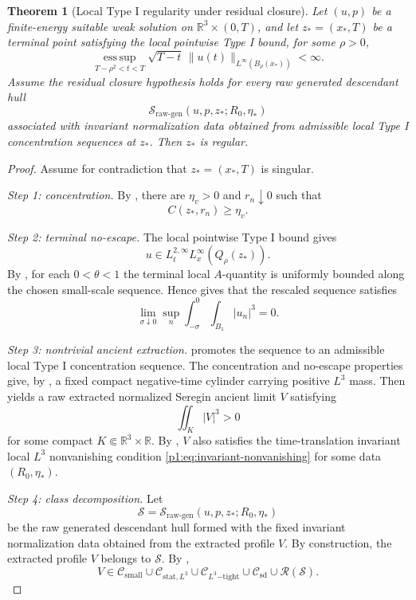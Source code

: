 \documentclass[11pt]{amsart}
\theoremstyle{plain}
\newtheorem{theorem}{Theorem}[section]
\theoremstyle{definition}
\theoremstyle{remark}
\numberwithin{equation}{section}
\newcommand{\R}{\mathbb R}
\newcommand{\esssup}{\operatorname*{ess\,sup}}
\newcommand{\calS}{\mathcal S}
\newcommand{\calR}{\mathcal R}
\newcommand{\calC}{\mathcal C}
\begin{document}
\begin{theorem}[Local Type I regularity under residual closure]
\label{p1:thm:final-assembly}
Let \((u,p)\) be a finite-energy suitable weak solution on
\(\R^3\times(0,T)\), and let \(z_*=(x_*,T)\) be a terminal point satisfying
the local pointwise Type I bound, for some \(\rho>0\),
\[
  \esssup_{T-\rho^2<t<T}
  \sqrt{T-t}\,\|u(t)\|_{L^\infty(B_\rho(x_*))}<\infty .
\]
Assume the residual closure hypothesis  holds for
every raw generated descendant hull
\[
   \calS_{\mathrm{raw\text{-}gen}}(u,p,z_*;R_0,\eta_*)
\]
associated with invariant normalization data obtained from admissible local
Type I concentration sequences at \(z_*\).
Then \(z_*\) is regular.
\end{theorem}

\begin{proof}
Assume for contradiction that \(z_*=(x_*,T)\) is singular.

\emph{Step 1: concentration.}
By , there are \(\eta_v>0\) and
\(r_n\downarrow0\) such that
\[
   C(z_*,r_n)\ge\eta_v .
\]

\emph{Step 2: terminal no-escape.}
The local pointwise Type I bound gives
\[
   u\in L_t^{2,\infty}L_x^\infty(Q_\rho(z_*)).
\]
By , for each \(0<\theta<1\) the
terminal local \(A\)-quantity is uniformly bounded along the chosen
small-scale sequence.  Hence  gives that
the rescaled sequence satisfies
\[
   \lim_{\sigma\downarrow0}\sup_n
   \int_{-\sigma}^{0}\int_{B_1}|u_n|^3=0 .
\]

\emph{Step 3: nontrivial ancient extraction.}
 promotes the sequence to
an admissible local Type I concentration sequence.  The concentration and no-escape
properties give, by
, a fixed compact
negative-time cylinder carrying positive \(L^3\) mass.  Then
 yields a raw extracted normalized
Seregin ancient limit \(V\) satisfying
\[
   \iint_K |V|^3>0
\]
for some compact \(K\Subset\R^3\times\R\).  By
, \(V\) also satisfies the
time-translation invariant local \(L^3\) nonvanishing condition
\eqref{p1:eq:invariant-nonvanishing} for some data \((R_0,\eta_*)\).

\emph{Step 4: class decomposition.}
Let
\[
   \calS=\calS_{\mathrm{raw\text{-}gen}}(u,p,z_*;R_0,\eta_*)
\]
be the raw generated descendant hull formed with the fixed invariant
normalization data obtained from the extracted profile \(V\).  By construction, the
extracted profile \(V\) belongs to \(\calS\).  By ,
\[
   V\in
   \calC_{\mathrm{small}}
   \cup
   \calC_{\mathrm{stat},L^3}
   \cup
   \calC_{L^3\mathrm{-tight}}
   \cup
   \calC_{\mathrm{sd}}
   \cup
   \calR(\calS).
\]


\end{proof}
\end{document}
